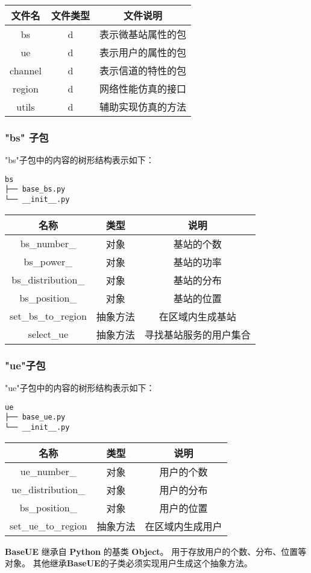\documentclass[11pt]{article}
\begin{document}
\begin{longtable}[c]{@{}ccc@{}}
\toprule
文件名 & 文件类型 & 文件说明\tabularnewline
\midrule
\endhead
bs & d & 表示微基站属性的包\tabularnewline
ue & d & 表示用户的属性的包\tabularnewline
channel & d & 表示信道的特性的包\tabularnewline
region & d & 网络性能仿真的接口\tabularnewline
utils & d & 辅助实现仿真的方法\tabularnewline
\bottomrule
\end{longtable}

    \subsubsection{"bs" 子包}\label{bs-ux5b50ux5305}

"bs"子包中的内容的树形结构表示如下：

\begin{verbatim}
bs
├── base_bs.py
└── __init__.py
\end{verbatim}

\begin{longtable}[c]{@{}ccc@{}}
\toprule
名称 & 类型 & 说明\tabularnewline
\midrule
\endhead
bs\_number\_ & 对象 & 基站的个数\tabularnewline
bs\_power\_ & 对象 & 基站的功率\tabularnewline
bs\_distribution\_ & 对象 & 基站的分布\tabularnewline
bs\_position\_ & 对象 & 基站的位置\tabularnewline
set\_bs\_to\_region & 抽象方法 & 在区域内生成基站\tabularnewline
select\_ue & 抽象方法 & 寻找基站服务的用户集合\tabularnewline
\bottomrule
\end{longtable}

    \subsubsection{"ue"子包}\label{ueux5b50ux5305}

"ue"子包中的内容的树形结构表示如下：

\begin{verbatim}
ue
├── base_ue.py
└── __init__.py
\end{verbatim}

\begin{longtable}[c]{@{}ccc@{}}
\toprule
名称 & 类型 & 说明\tabularnewline
\midrule
\endhead
ue\_number\_ & 对象 & 用户的个数\tabularnewline
ue\_distribution\_ & 对象 & 用户的分布\tabularnewline
bs\_position\_ & 对象 & 用户的位置\tabularnewline
set\_ue\_to\_region & 抽象方法 & 在区域内生成用户\tabularnewline
\bottomrule
\end{longtable}

\textbf{BaseUE} 继承自 \textbf{Python} 的基类 \textbf{Object}。
用于存放用户的个数、分布、位置等对象。
其他继承\textbf{BaseUE}的子类必须实现用户生成这个抽象方法。
\end{document}

